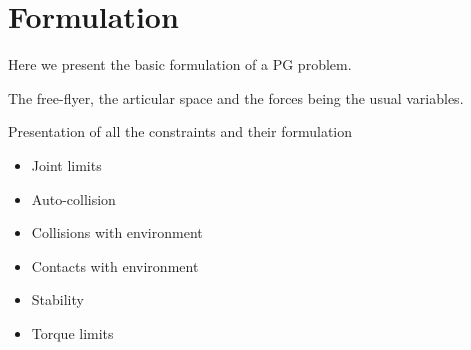 
\section{Formulation}

Here we present the basic formulation of a PG problem.

The free-flyer, the articular space and the forces being the usual variables.

Presentation of all the constraints and their formulation
\begin{itemize}
  \item Joint limits
  \item Auto-collision
  \item Collisions with environment
  \item Contacts with environment
  \item Stability
  \item Torque limits
\end{itemize}

